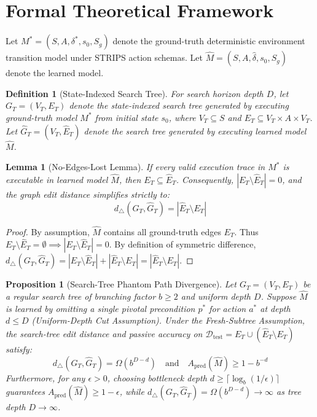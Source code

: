 \documentclass[preprint,12pt,3p]{elsarticle}
\newtheorem{definition}{Definition}
\newtheorem{lemma}{Lemma}
\newtheorem{proposition}{Proposition}
\begin{document}
\section{Formal Theoretical Framework}

Let $M^* = (S, A, \delta^*, s_0, S_g)$ denote the ground-truth deterministic environment transition model under STRIPS action schemas. Let $\hat{M} = (S, A, \hat{\delta}, s_0, S_g)$ denote the learned model.

\begin{definition}[State-Indexed Search Tree]
For search horizon depth $D$, let $G_T = (V_T, E_T)$ denote the state-indexed search tree generated by executing ground-truth model $M^*$ from initial state $s_0$, where $V_T \subseteq S$ and $E_T \subseteq V_T \times A \times V_T$. Let $\hat{G}_T = (V_T, \hat{E}_T)$ denote the search tree generated by executing learned model $\hat{M}$.
\end{definition}

\begin{lemma}[No-Edges-Lost Lemma]
If every valid execution trace in $M^*$ is executable in learned model $\hat{M}$, then $E_T \subseteq \hat{E}_T$. Consequently, $|E_T \setminus \hat{E}_T| = 0$, and the graph edit distance simplifies strictly to:
\begin{equation}
d_\triangle(G_T, \hat{G}_T) = |\hat{E}_T \setminus E_T|
\end{equation}
\end{lemma}

\begin{proof}
By assumption, $\hat{M}$ contains all ground-truth edges $E_T$. Thus $E_T \setminus \hat{E}_T = \emptyset \implies |E_T \setminus \hat{E}_T| = 0$. By definition of symmetric difference, $d_\triangle(G_T, \hat{G}_T) = |E_T \setminus \hat{E}_T| + |\hat{E}_T \setminus E_T| = |\hat{E}_T \setminus E_T|$.
\end{proof}

\begin{proposition}[Search-Tree Phantom Path Divergence]
Let $G_T = (V_T, E_T)$ be a regular search tree of branching factor $b \ge 2$ and uniform depth $D$. Suppose $\hat{M}$ is learned by omitting a single pivotal precondition $p^*$ for action $a^*$ at depth $d \le D$ (Uniform-Depth Cut Assumption). Under the Fresh-Subtree Assumption, the search-tree edit distance and passive accuracy on $\mathcal{D}_{\text{test}} = E_T \cup (\hat{E}_T \setminus E_T)$ satisfy:
\begin{equation}
d_\triangle(G_T, \hat{G}_T) = \Omega\left(b^{D-d}\right) \quad \text{and} \quad A_{\text{pred}}(\hat{M}) \ge 1 - b^{-d}
\end{equation}
Furthermore, for any $\epsilon > 0$, choosing bottleneck depth $d \ge \lceil \log_b(1/\epsilon) \rceil$ guarantees $A_{\text{pred}}(\hat{M}) \ge 1 - \epsilon$, while $d_\triangle(G_T, \hat{G}_T) = \Omega(b^{D-d}) \to \infty$ as tree depth $D \to \infty$.
\end{proposition}
\end{document}

